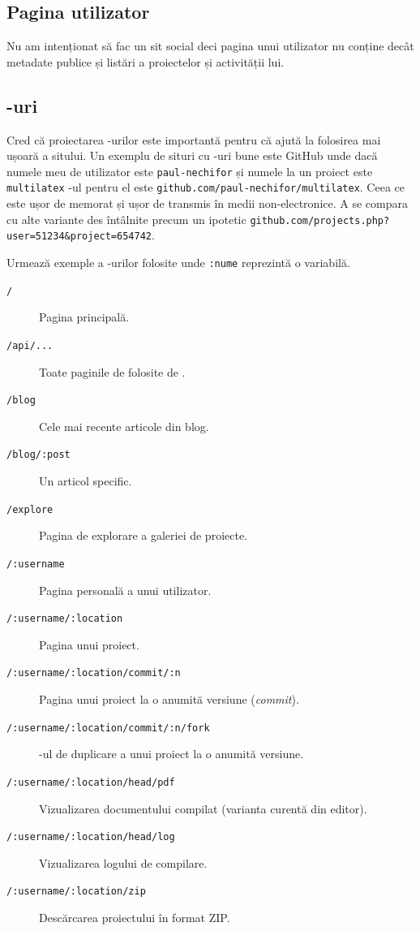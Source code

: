 \documentclass[a4wide,12pt]{report}
\newcommand{\eng}[1]{\emph{#1}} %
\newcommand{\cod}[1]{\texttt{#1}}
\newcommand{\acr}[1]{{\textsmaller[1]{\textsc{#1}}}} %
\begin{document}
\subsection{Pagina utilizator}

Nu am intenționat să fac un sit social deci pagina unui utilizator nu conține
decât metadate publice și listări a proiectelor și activității lui.

\subsection{\acr{URL}-uri}

Cred că proiectarea \acr{URL}-urilor este importantă pentru că ajută la
folosirea mai ușoară a sitului. Un exemplu de situri cu \acr{URL}-uri bune este
GitHub unde dacă numele meu de utilizator este \cod{paul-nechifor} și numele la
un proiect este \cod{multilatex} \acr{URL}-ul pentru el este
\cod{github.com/paul-nechifor/multilatex}. Ceea ce este ușor de memorat și ușor
de transmis în medii non-electronice. A se compara cu alte variante des
întâlnite precum un ipotetic
\cod{github.com/projects.php?user=51234\&project=654742}.

Urmează exemple a \acr{URL}-urilor folosite unde \cod{:nume} reprezintă o
variabilă.

\begin{description}

\item[\cod{/}] Pagina principală.

\item[\cod{/api/...}] Toate paginile de folosite de \acr{API}.

\item[\cod{/blog}] Cele mai recente articole din blog.

\item[\cod{/blog/:post}] Un articol specific.

\item[\cod{/explore}] Pagina de explorare a galeriei de proiecte.

\item[\cod{/:username}] Pagina personală a unui utilizator.

\item[\cod{/:username/:location}] Pagina unui proiect.

\item[\cod{/:username/:location/commit/:n}] Pagina unui proiect la o anumită
versiune (\eng{commit}).

\item[\cod{/:username/:location/commit/:n/fork}] \acr{URL}-ul de duplicare a
unui proiect la o anumită versiune.

\item[\cod{/:username/:location/head/pdf}] Vizualizarea documentului compilat
(varianta curentă din editor).

\item[\cod{/:username/:location/head/log}] Vizualizarea logului de compilare.

\item[\cod{/:username/:location/zip}] Descărcarea proiectului în format ZIP.

\end{description}
\end{document}
